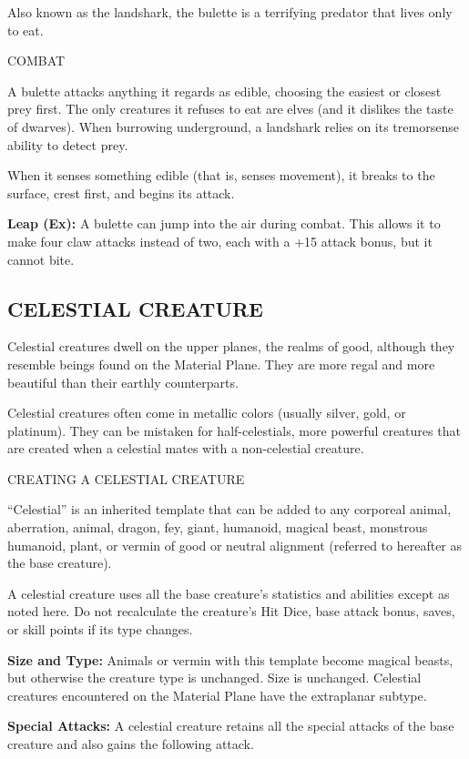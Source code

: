 \documentclass{article}
\begin{document}
Also known as the landshark, the bulette is a terrifying predator that lives only 
to eat. 

COMBAT

A bulette attacks anything it regards as edible, choosing the easiest or closest 
prey first. The only creatures it refuses to eat are elves (and it dislikes the 
taste of dwarves). When burrowing underground, a landshark relies on its tremorsense 
ability to detect prey.

When it senses something edible (that is, senses movement), it breaks to the surface, 
crest first, and begins its attack.

\textbf{Leap (Ex):} A bulette can jump into the air during combat. This allows 
it to make four claw attacks instead of two, each with a +15 attack bonus, but 
it cannot bite.

\vspace{12pt}
\subsection*{{\LARGE{}CELESTIAL CREATURE}}

Celestial creatures dwell on the upper planes, the realms of good, although they 
resemble beings found on the Material Plane. They are more regal and more beautiful 
than their earthly counterparts.

Celestial creatures often come in metallic colors (usually silver, gold, or platinum). 
They can be mistaken for half-celestials, more powerful creatures that are created 
when a celestial mates with a non-celestial creature.

CREATING A CELESTIAL CREATURE

``Celestial'' is an inherited template that can be added to any corporeal animal, 
aberration, animal, dragon, fey, giant, humanoid, magical beast, monstrous humanoid, 
plant, or vermin of good or neutral alignment (referred to hereafter as the base 
creature).

A celestial creature uses all the base creature's statistics and abilities except 
as noted here. Do not recalculate the creature's Hit Dice, base attack bonus, saves, 
or skill points if its type changes.

\textbf{Size and Type:} Animals or vermin with this template become magical beasts, 
but otherwise the creature type is unchanged. Size is unchanged. Celestial creatures 
encountered on the Material Plane have the extraplanar subtype.

\textbf{Special Attacks:} A celestial creature retains all the special attacks 
of the base creature and also gains the following attack.
\end{document}
